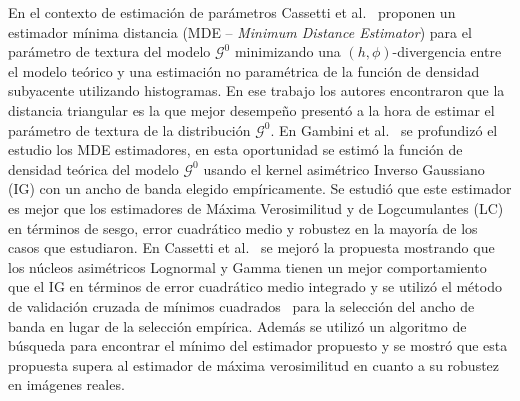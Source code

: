 \documentclass[12pt]{article}
\begin{document}
En el contexto de estimación de parámetros Cassetti et al.~\cite{APSAR2013ParameterEstimationStochasticDistances} proponen un estimador mínima distancia (MDE -- \textit{Minimum Distance Estimator}) para el parámetro de textura del modelo $\mathcal{G}^0$ minimizando una $(h,\phi)$-divergencia entre el modelo teórico y una estimación no paramétrica de la función de densidad subyacente utilizando histogramas. En ese trabajo los autores encontraron que la distancia triangular es la que mejor desempeño presentó a la hora de estimar el parámetro de textura de la distribución $\mathcal{G}^0$. En Gambini et al.~\cite{gambini2015} se profundizó el estudio los MDE estimadores, en esta oportunidad se estimó la función de densidad teórica del modelo $\mathcal{G}^0$  usando el kernel asimétrico Inverso Gaussiano (IG) con un ancho de banda elegido empíricamente. Se estudió que este estimador es mejor que los estimadores de Máxima Verosimilitud y de Logcumulantes (LC)~\cite{Tison2004} en términos de sesgo, error cuadrático medio y robustez en la mayoría de los casos que estudiaron. En Cassetti et al.~\cite{Cassetti2020} se mejoró la propuesta mostrando que los núcleos asimétricos Lognormal y Gamma tienen un mejor comportamiento que el IG en términos de error cuadrático medio integrado y se utilizó el método de validación cruzada de mínimos cuadrados~\cite{Rudemo1982} para la selección del ancho de banda en lugar de la selección empírica. Además se utilizó un algoritmo de búsqueda para encontrar el mínimo del estimador propuesto y se mostró que esta propuesta supera al estimador de máxima verosimilitud en cuanto a su robustez en imágenes reales.
  
\end{document}
